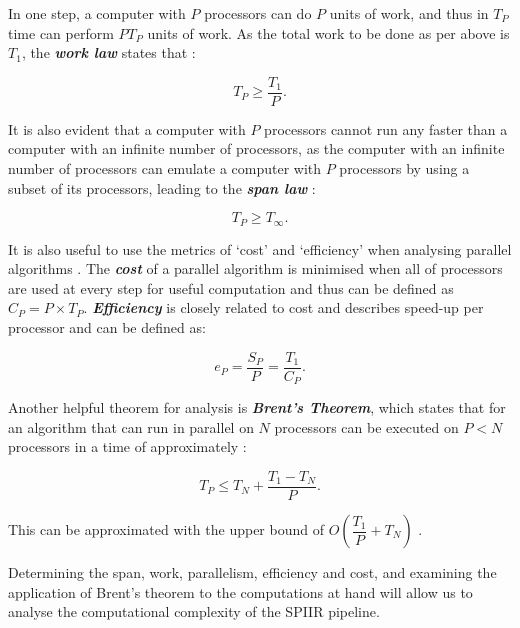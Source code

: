 \documentclass{article}
\begin{document}
In one step, a computer with \(P\) processors can do \(P\) units of work, and thus in \(T_P\) time can perform \(PT_P\) units of work.
As the total work to be done as per above is \(T_1\), the \textit{\textbf{work law}} states that \cite{CLRS_parallel}:

\begin{equation} \label{eq:work_law}
    T_P \geq \dfrac{T_1}{P}.
\end{equation}

It is also evident that a computer with \(P\) processors cannot run any faster than a computer with an infinite number of processors, as the computer with an infinite number of processors can emulate a computer with \(P\) processors by using a subset of its processors, leading to the \textit{\textbf{span law}} \cite{CLRS_parallel}:

\begin{equation} \label{eq:span_law}
    T_P \geq T_\infty.
\end{equation}

It is also useful to use the metrics of `cost' and `efficiency' when analysing parallel algorithms \cite{brent}.
The \textit{\textbf{cost}} of a parallel algorithm is minimised when all of processors are used at every step for useful computation and thus can be defined as \(C_P = P\times{T_P}\).
\textit{\textbf{Efficiency}} is closely related to cost and describes speed-up per processor and can be defined as:

\begin{equation} \label{eq:efficiency}
    e_P = \dfrac{S_P}{P} = \dfrac{T_1}{C_P}.
\end{equation}

Another helpful theorem for analysis is \textit{\textbf{Brent's Theorem}}, which states that for an algorithm that can run in parallel on \(N\) processors can be executed on \(P < N\) processors in a time of approximately \cite{BrentsLaw}:

\begin{equation} \label{eq:brents_law}
    T_P \leq T_N + \dfrac{T_1-T_N}{P}.
\end{equation}

This can be approximated with the upper bound of \(O(\dfrac{T_1}{P} + T_N)\) \cite{brent}.

Determining the span, work, parallelism, efficiency and cost, and examining the application of Brent's theorem to the computations at hand will allow us to analyse the computational complexity of the SPIIR pipeline.
\end{document}
